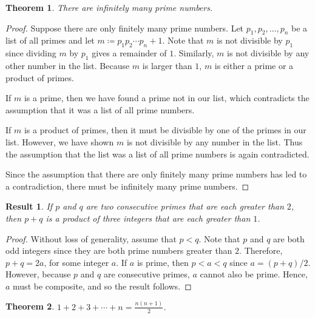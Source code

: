 \documentclass[headings=standardclasses]{scrartcl}
\newtheorem{theorem}{Theorem}[subsection]
\newtheorem{result}{Result}[subsection]
\theoremstyle{definition}
\begin{document}
\begin{theorem}
  There are infinitely many prime numbers.
\end{theorem}

\begin{proof}
  Suppose there are only finitely many prime numbers. Let \(p_1, p_2, \ldots,
  p_n\) be a list of all primes and let \(m ≔ p_{1}p_{2} \cdots p_n + 1\). Note
  that \(m\) is not divisible by \(p_1\) since dividing \(m\) by \(p_1\) gives
  a remainder of \(1\). Similarly, \(m\) is not divisible by any other number
  in the list. Because \(m\) is larger than \(1\), \(m\) is either a prime or a
  product of primes.

  If \(m\) is a prime, then we have found a prime not in our list, which
  contradicts the assumption that it was a list of all prime numbers.

  If \(m\) is a product of primes, then it must be divisible by one of the
  primes in our list. However, we have shown \(m\) is not divisible by any
  number in the list. Thus the assumption that the list was a list of all prime
  numbers is again contradicted.

  Since the assumption that there are only finitely many prime numbers has led
  to a contradiction, there must be infinitely many prime numbers.
\end{proof}

\begin{result}
  If \(p\) and \(q\) are two consecutive primes that are each greater than
  \(2\), then \(p + q\) is a product of three integers that are each greater
  than \(1\).
\end{result}

\begin{proof}
  Without loss of generality, assume that \(p < q\). Note that \(p\) and \(q\)
  are both odd integers since they are both prime numbers greater than \(2\).
  Therefore, \(p + q = 2a\), for some integer \(a\). If \(a\) is prime, then
  \(p < a < q\) since \(a = (p + q)/2\). However, because \(p\) and \(q\) are
  consecutive primes, \(a\) cannot also be prime. Hence, \(a\) must be
  composite, and so the result follows.
\end{proof}

\begin{theorem}
  \(\displaystyle 1 + 2 + 3 + \cdots + n = \frac{n(n + 1)}{2}\).
\end{theorem}
\end{document}
